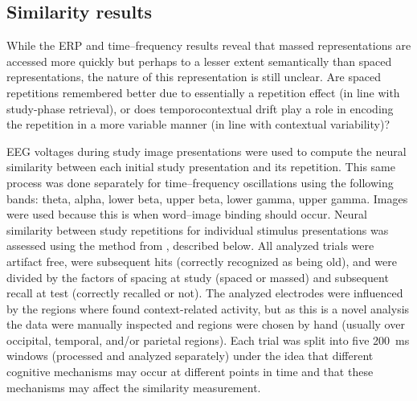
\subsection{Similarity results}

While the ERP and time--frequency results reveal that massed representations are accessed more quickly but perhaps to a lesser extent semantically than spaced representations, the nature of this representation is still unclear.  Are spaced repetitions remembered better due to essentially a repetition effect (in line with study-phase retrieval), or does temporocontextual drift play a role in encoding the repetition in a more variable manner (in line with contextual variability)?

EEG voltages during study image presentations were used to compute the neural similarity between each initial study presentation and its repetition.  This same process was done separately for time--frequency oscillations using the following bands: theta, alpha, lower beta, upper beta, lower gamma, upper gamma.  Images were used because this is when word--image binding
should occur.  Neural similarity between study repetitions for individual stimulus presentations was assessed using the method from , described below.  All analyzed trials were artifact free, were subsequent hits (correctly recognized as being old), and were divided by the factors of spacing at study (spaced or massed) and subsequent recall at test (correctly recalled or not).
The analyzed electrodes were influenced by the regions where  found context-related activity, but as this is a novel analysis the data were manually inspected and regions were chosen by hand (usually over occipital, temporal, and/or parietal regions).  Each trial was split into five 200~ms windows (processed and analyzed separately) under the idea that different cognitive mechanisms may occur at different points in time and that these mechanisms may affect the similarity measurement.


